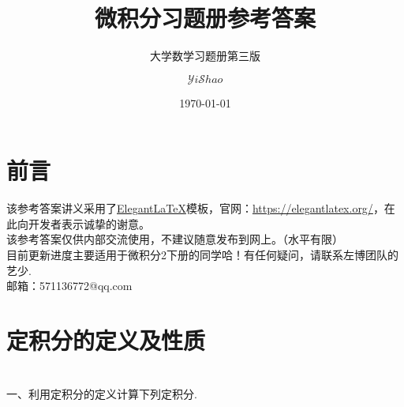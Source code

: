 \documentclass[lang=cn,newtx,10pt,scheme=chinese]{elegantbook}
\title{微积分习题册参考答案}
\subtitle{大学数学习题册第三版}
\author{$\mathcal{Y}i\mathcal{S}hao$}
\date{\today}
\begin{document}
\maketitle
\frontmatter
\chapter*{前言}
该参考答案讲义采用了\href{https://elegantlatex.org/}{Elegant\LaTeX}模板，官网：\href{https://elegantlatex.org/}{https://elegantlatex.org/}，在此向开发者表示诚挚的谢意。\\

该参考答案仅供内部交流使用，不建议随意发布到网上。（水平有限）\\


目前更新进度主要适用于微积分2下册的同学哈！有任何疑问，请联系左博团队的艺少.\\

邮箱：571136772@qq.com

\tableofcontents

\mainmatter





\chapter{定积分的定义及性质}
~\\
一、利用定积分的定义计算下列定积分.\\
\end{document}
